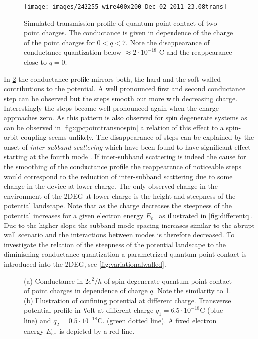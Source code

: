 \begin{figure}[h]
\centering
\texttt{[image: images/242255-wire400x200-Dec-02-2011-23.08trans]}
\caption{Simulated transmission profile of quantum point contact of two point charges. The conductance is given in dependence of the charge of the point charges for $0 < q <7$. Note the disappearance of conductance quantization below $\approx 2\cdot10^{-18}$ C and the reappearance close to $q=0$.}\label{fig:qpcpointtransspin}
\end{figure}
In \cref{fig:pointtrans} the conductance profile mirrors both, the hard and the soft walled contributions to the potential. A well pronounced first and second conductance step can be observed but the steps smooth out more with decreasing charge. Interestingly the steps become well pronounced again when the charge approaches zero. As this pattern is also observed for spin degenerate systems as can be observed in \cref{fig:qpcpointtransnospin} a relation of this effect to a spin-orbit coupling seems unlikely. 
The disappearance of steps can be explained by the onset of \emph{inter-subband scattering} which have been found to have significant effect starting at the fourth mode \cite{Lehmann2011}. If inter-subband scattering is indeed the cause for the smoothing of the conductance profile the reappearance of noticeable steps would correspond to the reduction of inter-subband scattering due to some change in the device at lower charge. The only observed change in the environment of the 2DEG at lower charge is the height and steepness of the potential landscape.
Note that as the charge decreases the steepness of the potential increases for a given electron energy $E_{e^-}$ as illustrated in \cref{fig:differentq}. Due to the higher slope the subband mode spacing increases similar to the abrupt wall scenario and the interactions between modes is therefore decreased.
 To investigate the relation of the steepness of the potential landscape to the diminishing conductance quantization a parametrized  quantum point contact is introduced into the 2DEG, see \cref{fig:variationalwalled}.
\begin{figure}[h]
\centering
{}
\caption{(a) Conductance in 2$e^2/h$ of spin degenerate quantum point contact of point charges in dependence of charge $q$. Note the similarity to \cref{fig:qpcpointtransspin}. (b) Illustration of confining potential at different charge. Transverse potential profile in Volt at different charge $q_1 = 6.5 \cdot 10^{-18}$C (blue line) and $q_2= 0.5 \cdot 10^{-18}$C. (green dotted line). A fixed electron energy $E_{e^-}$ is depicted by a red line.}\label{fig:pointtrans}
\end{figure}
\FloatBarrier
